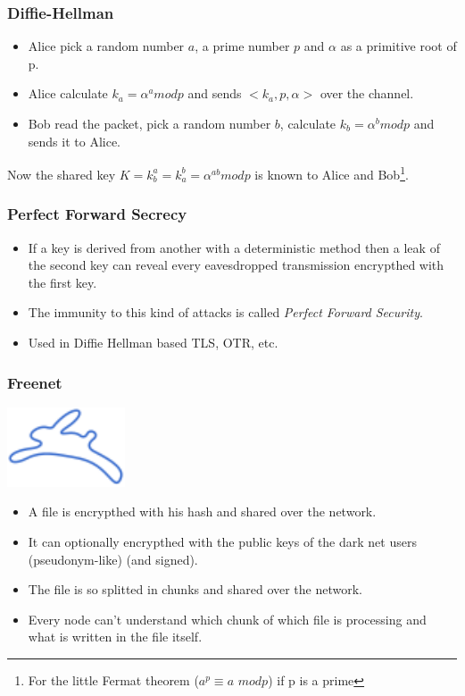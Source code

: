 \begin{frame}[noframenumbering]
	\frametitle{Diffie-Hellman}
	\begin{itemize}
		\item Alice pick a random number $a$, a prime number $p$ and
		$\alpha$ as a primitive root of p.
		\item Alice calculate $k_a = \alpha ^{a} mod p$ and sends $<k_a,
		p, \alpha>$ over the channel.
		\item Bob read the packet, pick a random number $b$,
		calculate $k_b = \alpha^{b} mod p$ and sends it to Alice.
	\end{itemize}
	Now the shared key $K = k_b^{a} = k_a^{b} = \alpha^{ab} mod p$ is known
	to Alice and Bob\footnote{For the little Fermat theorem ($a^p \equiv a$
	$mod p$) if p is a prime}.
\end{frame}

\begin{frame}[noframenumbering]
	\frametitle{Perfect Forward Secrecy}
	\begin{itemize}
		\item If a key is derived from another with a deterministic
		method then a leak of the second key can reveal every
		eavesdropped transmission encrypthed with the first key.
		\item The immunity to this kind of attacks is called
		\textit{Perfect Forward Security}.
		\item Used in Diffie Hellman based TLS, OTR, etc.
	\end{itemize}
\end{frame}

\begin{frame}[noframenumbering]
	\frametitle{Freenet}
	\begin{center}
	\includegraphics[scale=0.7]{imgs/Freenet_logo}
	\end{center}
	\begin{itemize}
		\item A file is encrypthed with his hash and shared over the
		network.
		\item It can optionally encrypthed with the public keys of the
		dark net users (pseudonym-like) (and signed).
		\item The file is so splitted in chunks and shared over the
		network.
		\item Every node can't understand which chunk of which file is
		processing and what is written in the file itself.
	\end{itemize}
\end{frame}

